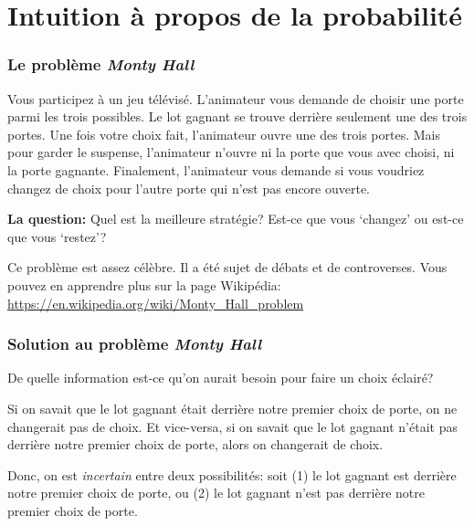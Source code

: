 \documentclass{beamer}
\begin{document}

\section{Intuition à propos de la probabilité}


\begin{frame}
    \frametitle{Le problème \emph{Monty Hall}}
    Vous participez à un jeu télévisé.
    L’animateur vous demande de choisir une porte parmi les trois possibles.
    Le lot gagnant se trouve derrière seulement une des trois portes.
    Une fois votre choix fait, l’animateur ouvre une des trois portes.
    Mais pour garder le suspense, l’animateur n’ouvre ni la porte que
    vous avec choisi, ni la porte gagnante.
    Finalement, l’animateur vous demande si vous voudriez changez de choix
    pour l’autre porte qui n’est pas encore ouverte.\\

    \bigskip \pause

    \textbf{La question:} Quel est la meilleure stratégie?
    Est-ce que vous ‘changez’ ou est-ce que vous ‘restez’?\\

    \bigskip \pause

    Ce problème est assez célèbre. Il a été sujet de débats et de controverses.
    Vous pouvez en apprendre plus sur la page Wikipédia:
    \url{https://en.wikipedia.org/wiki/Monty_Hall_problem}
\end{frame}


\begin{frame}
    \frametitle{Solution au problème \emph{Monty Hall}}
    De quelle information est-ce qu’on aurait besoin pour faire un choix éclairé?\\

    \bigskip \pause

    Si on savait que le lot gagnant était derrière notre premier choix de porte,
    on ne changerait pas de choix. Et vice-versa, si on savait que le lot gagnant
    n’était pas derrière notre premier choix de porte, alors on changerait de choix.\\

    \bigskip \pause

    Donc, on est \emph{incertain} entre deux possibilités:
    soit (1) le lot gagnant est derrière notre premier choix de porte,
    ou (2) le lot gagnant n’est pas derrière notre premier choix de porte.    
\end{frame}
\end{document}

